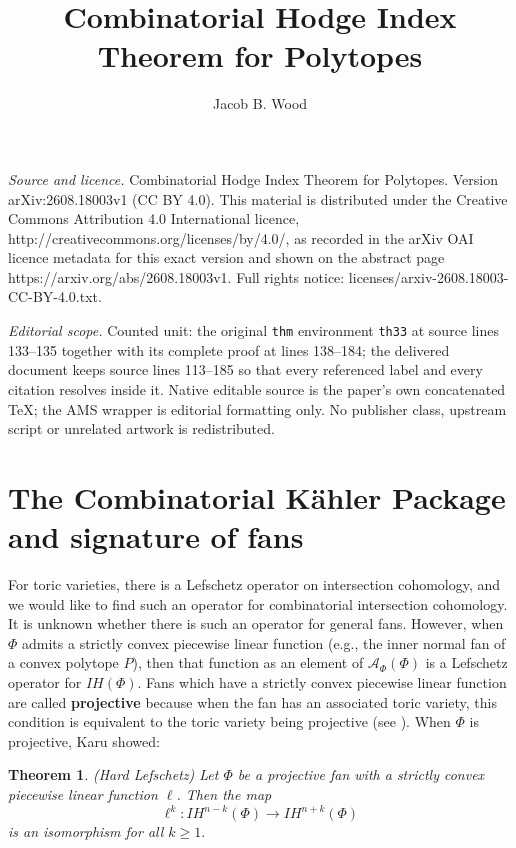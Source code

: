 \documentclass[10pt,a4paper]{amsart}
\newtheorem{thm}{Theorem}[section]
\begin{document}
\title[Combinatorial Hodge Index Theorem for Polytopes]{Combinatorial Hodge Index Theorem for Polytopes}
\author{Jacob B. Wood}
\date{}
\maketitle
\noindent\emph{Source and licence.} Combinatorial Hodge Index Theorem for Polytopes. Version arXiv:2608.18003v1 (CC BY 4.0). This material is distributed under the Creative Commons Attribution 4.0 International licence, http://creativecommons.org/licenses/by/4.0/, as recorded in the arXiv OAI licence metadata for this exact version and shown on the abstract page https://arxiv.org/abs/2608.18003v1. Full rights notice: licenses/arxiv-2608.18003-CC-BY-4.0.txt.\par\smallskip
\noindent\textit{Editorial scope.} Counted unit: the original \texttt{thm} environment \texttt{th33} at source lines 133--135 together with its complete proof at lines 138--184; the delivered document keeps source lines 113--185 so that every referenced label and every citation resolves inside it. Native editable source is the paper's own concatenated TeX; the AMS wrapper is editorial formatting only. No publisher class, upstream script or unrelated artwork is redistributed.
\section{The Combinatorial K\"ahler Package and signature of fans}

For toric varieties, there is a Lefschetz operator on intersection cohomology, and we would like to find such an operator for combinatorial intersection cohomology. It is unknown whether there is such an operator for general fans. However, when $\Phi$ admits a strictly convex piecewise linear function (e.g., the inner normal fan of a convex polytope $P$), then that function as an element of $\mathcal{A}_{\Phi}(\Phi)$ is a Lefschetz operator for $IH(\Phi)$. Fans which have a strictly convex piecewise linear function are called \textbf{projective} because when the fan has an associated toric variety, this condition is equivalent to the toric variety being projective (see \cite[6.9]{D}). When $\Phi$ is projective, Karu \cite[Theorem 0.1]{K} showed:


\begin{thm} (Hard Lefschetz) \label{th31} Let $\Phi$ be a projective fan with a strictly convex piecewise linear function $\ell$. Then the map \[\ell^k:IH^{n-k}(\Phi)\rightarrow IH^{n+k}(\Phi)\] is an isomorphism for all $k\geq 1.$
\end{thm}
\end{document}
